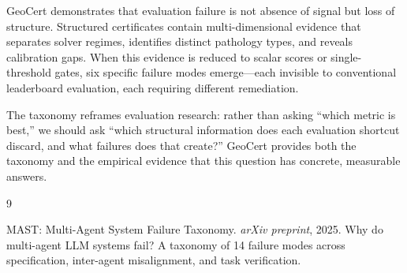 \documentclass{article}
\begin{document}
GeoCert demonstrates that evaluation failure is not absence of signal but loss of structure. Structured certificates contain multi-dimensional evidence that separates solver regimes, identifies distinct pathology types, and reveals calibration gaps. When this evidence is reduced to scalar scores or single-threshold gates, six specific failure modes emerge---each invisible to conventional leaderboard evaluation, each requiring different remediation.

The taxonomy reframes evaluation research: rather than asking ``which metric is best,'' we should ask ``which structural information does each evaluation shortcut discard, and what failures does that create?'' GeoCert provides both the taxonomy and the empirical evidence that this question has concrete, measurable answers.

\begin{thebibliography}{9}

MAST: Multi-Agent System Failure Taxonomy.
\textit{arXiv preprint}, 2025.
Why do multi-agent LLM systems fail? A taxonomy of 14 failure modes across specification, inter-agent misalignment, and task verification.

\end{thebibliography}
\end{document}
